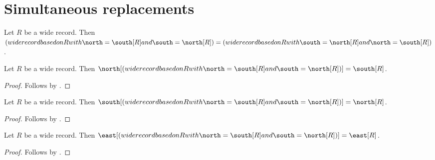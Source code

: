 

\section{Simultaneous replacements}

\begin{proposition}\label{wide_swap_entry_order}
    Let $R$ be a wide record.
    Then $(wide record based on R with \north=\south[R] and \south=\north[R])=
        (wide record based on R with \south=\north[R] and \north=\south[R])$.
\end{proposition}

\begin{proposition}\label{wide_swap_north}
    Let $R$ be a wide record.
    Then $\north[(wide record based on R with \north=\south[R] and \south=\north[R])]=\south[R]$.
\end{proposition}
\begin{proof}
    Follows by .
\end{proof}

\begin{proposition}\label{wide_swap_south}
    Let $R$ be a wide record.
    Then $\south[(wide record based on R with \north=\south[R] and \south=\north[R])]=\north[R]$.
\end{proposition}
\begin{proof}
    Follows by .
\end{proof}

\begin{proposition}\label{wide_swap_untouched}
    Let $R$ be a wide record.
    Then $\east[(wide record based on R with \north=\south[R] and \south=\north[R])]=\east[R]$.
\end{proposition}
\begin{proof}
    Follows by .
\end{proof}

